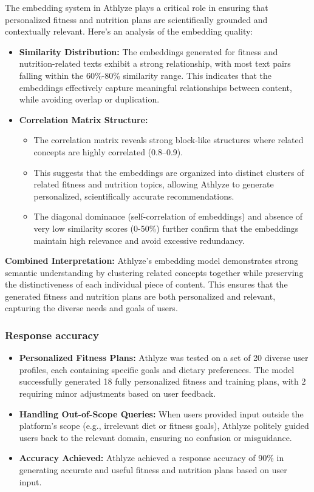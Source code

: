 \documentclass[conference]{IEEEtran}
\begin{document}
The embedding system in Athlyze plays a critical role in ensuring that personalized fitness and nutrition plans are scientifically grounded and contextually relevant. Here's an analysis of the embedding quality:

\begin{itemize}
    \item \textbf{Similarity Distribution:} The embeddings generated for fitness and nutrition-related texts exhibit a strong relationship, with most text pairs falling within the 60\%-80\% similarity range. This indicates that the embeddings effectively capture meaningful relationships between content, while avoiding overlap or duplication.
    \item \textbf{Correlation Matrix Structure:} 
    \begin{itemize}
        \item The correlation matrix reveals strong block-like structures where related concepts are highly correlated (0.8–0.9). 
        \item This suggests that the embeddings are organized into distinct clusters of related fitness and nutrition topics, allowing Athlyze to generate personalized, scientifically accurate recommendations.
        \item The diagonal dominance (self-correlation of embeddings) and absence of very low similarity scores (0-50\%) further confirm that the embeddings maintain high relevance and avoid excessive redundancy.
    \end{itemize}
\end{itemize}

\textbf{Combined Interpretation:} Athlyze's embedding model demonstrates strong semantic understanding by clustering related concepts together while preserving the distinctiveness of each individual piece of content. This ensures that the generated fitness and nutrition plans are both personalized and relevant, capturing the diverse needs and goals of users.

\subsubsection{Response accuracy}

\begin{itemize}
    \item \textbf{Personalized Fitness Plans:} Athlyze was tested on a set of 20 diverse user profiles, each containing specific goals and dietary preferences. The model successfully generated 18 fully personalized fitness and training plans, with 2 requiring minor adjustments based on user feedback.
    \item \textbf{Handling Out-of-Scope Queries:} When users provided input outside the platform's scope (e.g., irrelevant diet or fitness goals), Athlyze politely guided users back to the relevant domain, ensuring no confusion or misguidance.
    \item \textbf{Accuracy Achieved:} Athlyze achieved a response accuracy of 90\% in generating accurate and useful fitness and nutrition plans based on user input.
\end{itemize}
\end{document}
